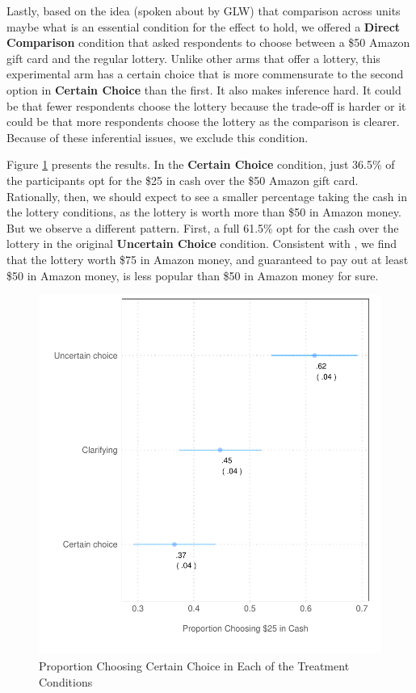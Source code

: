 \documentclass[12pt, letterpaper]{article}
\begin{document}
Lastly, based on the idea (spoken about by GLW) that comparison across units maybe what is an essential condition for the effect to hold, we offered a \textbf{Direct Comparison} condition that asked respondents to choose between a \$50 Amazon gift card and the regular lottery. Unlike other arms that offer a lottery, this experimental arm has a certain choice that is more commensurate to the second option in \textbf{Certain Choice} than the first. It also makes inference hard. It could be that fewer respondents choose the lottery because the trade-off is harder or it could be that more respondents choose the lottery as the comparison is clearer. Because of these inferential issues, we exclude this condition.

Figure \ref{fig:exp_1_lucid} presents the results. In the \textbf{Certain Choice} condition, just 36.5\% of the participants opt for the \$25 in cash over the \$50 Amazon gift card. Rationally, then, we should expect to see a smaller percentage taking the cash in the lottery conditions, as the lottery is worth more than \$50 in Amazon money. But we observe a different pattern. First, a full 61.5\% opt for the cash over the lottery in the original \textbf{Uncertain Choice} condition. Consistent with \citet{gneezy2006uncertainty}, we find that the lottery worth \$75 in Amazon money, and guaranteed to pay out at least \$50 in Amazon money, is less popular than \$50 in Amazon money for sure.

\begin{figure}[h]
    \centering
    \includegraphics{figs/lucid_exp.pdf}
    \caption{Proportion Choosing Certain Choice in Each of the Treatment Conditions}
    \label{fig:exp_1_lucid}
\end{figure}
\end{document}
